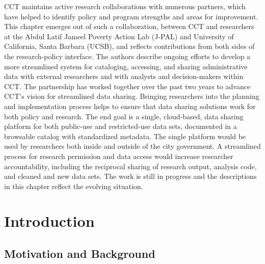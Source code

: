\documentclass[11pt]{book}
\begin{document}
CCT maintains active research collaborations with numerous partners, which have helped to identify policy and program strengths and areas for improvement. This chapter emerges out of such a collaboration, between CCT and researchers at the Abdul Latif Jameel Poverty Action Lab (J-PAL) and University of California, Santa Barbara (UCSB), and reflects contributions from both sides of the research-policy interface. The authors describe ongoing efforts to develop a more streamlined system for cataloging, accessing, and sharing administrative data with external researchers and with analysts and decision-makers within CCT. The partnership has worked together over the past two years to advance CCT’s vision for streamlined data sharing. Bringing researchers into the planning and implementation process helps to ensure that data sharing solutions work for both policy and research. The end goal is a single, cloud-based, data sharing platform for both public-use and restricted-use data sets, documented in a browsable catalog with standardized metadata. The single platform would be used by researchers both inside and outside of the city government. A streamlined process for research permission and data access would increase researcher accountability, including the reciprocal sharing of research output, analysis code, and cleaned and new data sets. The work is still in progress and the descriptions in this chapter reflect the evolving situation.

\section{Introduction}
\subsection{Motivation and Background}
\end{document}

